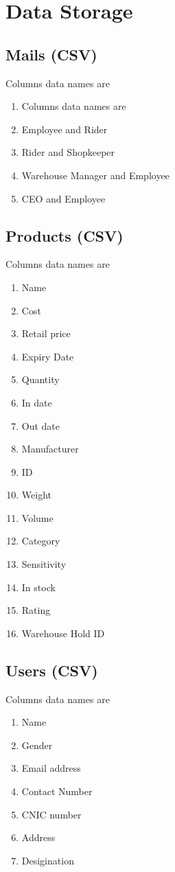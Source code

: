 \documentclass[12pt,a4paper]{report}
\begin{document}
\chapter {Data Storage}

\section{Mails (CSV)}
Columns data names are
\begin{enumerate}
\item Columns data names are
\item Employee and Rider
\item Rider and Shopkeeper
\item Warehouse Manager and Employee
\item CEO and Employee
\end{enumerate}


\section{Products (CSV)}
Columns data names are
\begin{enumerate}
\item Name
\item Cost
\item Retail price
\item Expiry Date
\item Quantity
\item In date 
\item Out date
\item Manufacturer 
\item ID
\item Weight
\item Volume
\item Category
\item Sensitivity
\item In stock
\item Rating
\item Warehouse Hold ID
\end{enumerate}

\section{Users (CSV)}
Columns data names are
\begin{enumerate}
\item Name 
\item Gender
\item Email address
\item Contact Number
\item CNIC number
\item Address
\item Desigination 
\end{enumerate}
\end{document}
